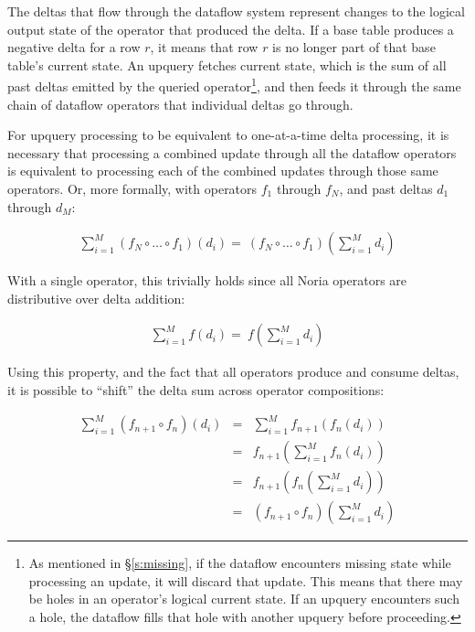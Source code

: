 The deltas that flow through the dataflow system represent changes to the
logical output state of the operator that produced the delta. If a base table
produces a negative delta for a row $r$, it means that row $r$ is no longer part
of that base table's current state. An upquery fetches current state, which is
the sum of all past deltas emitted by the queried operator\footnote{As mentioned
in \S\ref{s:missing}, if the dataflow encounters missing state while processing
an update, it will discard that update. This means that there may be holes in an
operator's logical current state. If an upquery encounters such a hole, the
dataflow fills that hole with another upquery before proceeding.}, and then
feeds it through the same chain of dataflow operators that individual deltas go
through.

For upquery processing to be equivalent to one-at-a-time delta processing, it is
necessary that processing a combined update through all the dataflow operators
is equivalent to processing each of the combined updates through those same
operators. Or, more formally, with operators $f_1$ through $f_N$, and past
deltas $d_1$ through $d_M$:

\begin{eqnarray*}
  \sum^M_{i=1}\left(f_N \circ \dots \circ f_1\right)\left(d_i\right) = \
  \left(f_N \circ \dots \circ f_1\right)\left(\sum^M_{i=1}d_i\right)
\end{eqnarray*}

With a single operator, this trivially holds since all Noria operators are
distributive over delta addition:

\begin{eqnarray*}
  \sum^M_{i=1}f\left(d_i\right) = \
  f\left(\sum^M_{i=1}d_i\right)
\end{eqnarray*}

Using this property, and the fact that all operators produce and consume deltas,
it is possible to ``shift'' the delta sum across operator compositions:

\begin{eqnarray*}
  \sum^M_{i=1}\left(f_{n+1} \circ f_n\right)\left(d_i\right) &=& \sum^M_{i=1}f_{n+1}\left(f_n\left(d_i\right)\right) \\
  &=& f_{n+1}\left(\sum^M_{i=1}f_n\left(d_i\right)\right) \\
  &=& f_{n+1}\left(f_n\left(\sum^M_{i=1}d_i\right)\right) \\
  &=& \left(f_{n+1} \circ f_n\right)\left(\sum^M_{i=1}d_i\right)
\end{eqnarray*}

